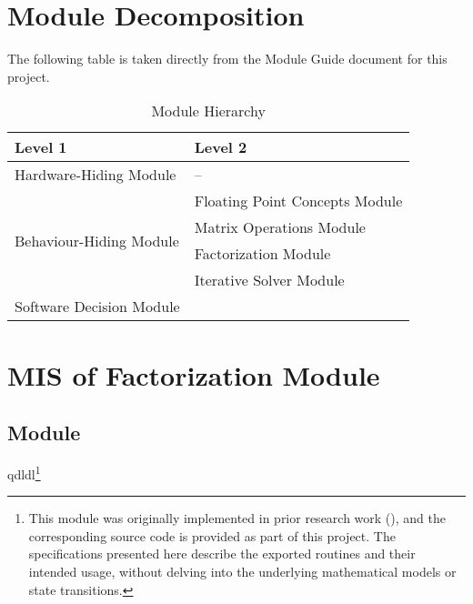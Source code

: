 \documentclass[12pt, titlepage]{article}
\begin{document}
\section{Module Decomposition}

The following table is taken directly from the Module Guide document for this project.

\begin{table}[H]
  \centering
  \begin{tabular}{p{} p{}}
    \toprule
    \textbf{Level 1}                                            & \textbf{Level 2}                     \\
    \midrule
    {Hardware-Hiding Module}                              & --                             \\
    \midrule
    \multirow{4}{0.3\textwidth}{Behaviour-Hiding Module}  & Floating Point Concepts Module \\
                                                          & Matrix Operations Module       \\
                                                          & Factorization Module           \\
                                                          & Iterative Solver Module        \\
    \midrule
    \multirow{1}{0.3\textwidth}{Software Decision Module} &                                \\
    \bottomrule
  \end{tabular}
  \caption{Module Hierarchy}
  \label{TblMH}
\end{table}

\newpage

\section{MIS of Factorization Module} \label{M:factor}

\subsection{Module}

qdldl\footnote{This module was originally implemented in prior research work
  (\cite{shahrooz_derakhshan_using_2023}), and the corresponding source code is
  provided as part of this project. The specifications presented here describe
  the exported routines and their intended usage, without delving into the
  underlying mathematical models or state transitions.}
\end{document}
